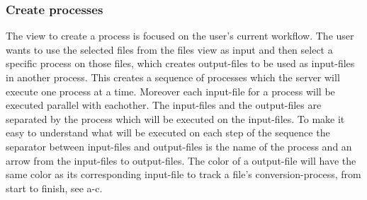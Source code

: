 %
%


\subsubsection{Create processes}
The view to create a process is focused on the user's current workflow. The user wants to use the selected files from the files view as input and then select a specific process on those files, which creates output-files to be used as input-files in another process. This creates a sequence of processes which the server will execute one process at a time. Moreover each input-file for a process will be executed parallel with eachother. The input-files and the output-files are separated by the process which will be executed on the input-files. To make it easy to understand what will be executed on each step of the sequence the separator between input-files and output-files is the name of the process and an arrow from the input-files to output-files. The color of a output-file will have the same color as its corresponding input-file to track a file's conversion-process, from start to finish, see a-c. 



